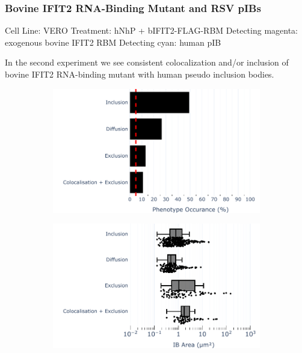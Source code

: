 \subsubsection{Bovine IFIT2 RNA-Binding Mutant and RSV pIBs} \label{Bovine IFIT2 RNA-Binding Mutant and RSV pIBs}
Cell Line: VERO
Treatment: hNhP + bIFIT2-FLAG-RBM
Detecting magenta: exogenous bovine IFIT2 RBM
Detecting cyan: human pIB

In the second experiment we see consistent colocalization and/or inclusion of bovine IFIT2 RNA-binding mutant with human pseudo inclusion bodies.

\begin{figure}
    \begin{subfigure}{0.5\textwidth}
        \caption{}
        \includegraphics[width=1\linewidth]{10. Chapter 5/Figs/04. IFIT2-RNA binding mutant/02. pIB/01. bar_bi2f24_hnhp.pdf} 
    \end{subfigure}
    \begin{subfigure}{0.5\textwidth}
        \caption{}
        \includegraphics[width=1\linewidth]{10. Chapter 5/Figs/04. IFIT2-RNA binding mutant/02. pIB/02. box_bi2f24_hnhp.pdf}

\end{subfigure}
\end{figure}
